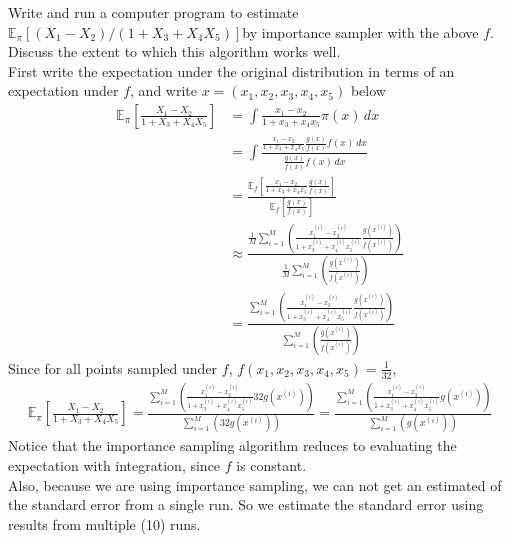 
Write and run a computer program to estimate $\mathbb{E}_\pi[(X_1-X_2)/(1+X_3+X_4X_5)]$by importance sampler with the above $f$. Discuss the extent to which this algorithm works well.\\
First write the expectation under the original distribution in terms of an expectation under $f$, and write $x=(x_1,x_2,x_3,x_4,x_5)$ below
\begin{align*}
\mathbb{E}_\pi\left[\frac{X_1-X_2}{1+X_3+X_4X_5}\right]&=\int \frac{x_1-x_2}{1+x_3+x_4x_5} \pi(x)\,dx\\
  &=\int \frac{\frac{x_1-x_2}{1+x_3+x_4x_5} \frac{g(x)}{f(x)}f(x)\,dx}{\frac{g(x)}{f(x)}f(x)\,dx}\\
  &=\frac{\mathbb{E}_f[\frac{x_1-x_2}{1+x_3+x_4x_5} \frac{g(x)}{f(x)}]}{\mathbb{E}_f[\frac{g(x)}{f(x)}]}\\
  &\approx\frac{\frac{1}{M}\sum_{i=1}^M\left(\frac{x_1^{(i)}-x_2^{(i)}}{1+x_3^{(i)}+x_4^{(i)}x_5^{(i)}} \frac{g(x^{(i)})}{f(x^{(i)})}\right)}{\frac{1}{M}\sum_{i=1}^M\left(\frac{g(x^{(i)})}{f(x^{(i)})}\right)}\\
  &=\frac{\sum_{i=1}^M\left(\frac{x_1^{(i)}-x_2^{(i)}}{1+x_3^{(i)}+x_4^{(i)}x_5^{(i)}} \frac{g(x^{(i)})}{f(x^{(i)})}\right)}{\sum_{i=1}^M\left(\frac{g(x^{(i)})}{f(x^{(i)})}\right)}
\end{align*}
Since for all points sampled under $f$, $f(x_1,x_2,x_3,x_4,x_5)=\frac{1}{32}$, 
\begin{align*}
\mathbb{E}_\pi\left[\frac{X_1-X_2}{1+X_3+X_4X_5}\right]=\frac{\sum_{i=1}^M\left(\frac{x_1^{(i)}-x_2^{(i)}}{1+x_3^{(i)}+x_4^{(i)}x_5^{(i)}} 32g(x^{(i)})\right)}{\sum_{i=1}^M\left(32g(x^{(i)})\right)}=\frac{\sum_{i=1}^M\left(\frac{x_1^{(i)}-x_2^{(i)}}{1+x_3^{(i)}+x_4^{(i)}x_5^{(i)}} g(x^{(i)})\right)}{\sum_{i=1}^M\left(g(x^{(i)})\right)}
\end{align*}
Notice that the importance sampling algorithm reduces to evaluating the expectation with integration, since $f$ is constant. \\
Also, because we are using importance sampling, we can not get an estimated of the standard error from a single run. So we estimate the standard error using results from multiple (10) runs.\\


